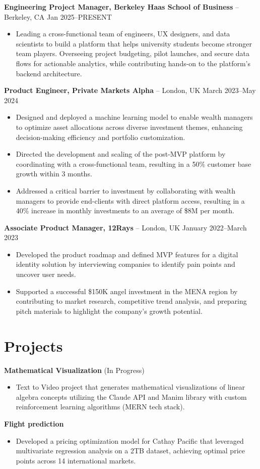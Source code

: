 \documentclass{article}
\begin{document}
\textbf{Engineering Project Manager, Berkeley Haas School of Business} -- Berkeley, CA \hfill Jan 2025--PRESENT
\begin{itemize}[leftmargin=*,noitemsep]
    \item Leading a cross-functional team of engineers, UX designers, and data scientists to build a platform that helps university students become stronger team players. Overseeing project budgeting, pilot launches, and secure data flows for actionable analytics, while contributing hands-on to the platform's backend architecture.
\end{itemize}

\textbf{Product Engineer, Private Markets Alpha} -- London, UK \hfill March 2023--May 2024
\begin{itemize}[leftmargin=*,noitemsep]
    \item Designed and deployed a machine learning model to enable wealth managers to optimize asset allocations across diverse investment themes, enhancing decision-making efficiency and portfolio customization.
    \item Directed the development and scaling of the post-MVP platform by coordinating with a cross-functional team, resulting in a 50\% customer base growth within 3 months.
    \item Addressed a critical barrier to investment by collaborating with wealth managers to provide end-clients with direct platform access, resulting in a 40\% increase in monthly investments to an average of \$8M per month.
\end{itemize}

\textbf{Associate Product Manager, 12Rays} -- London, UK \hfill January 2022--March 2023
\begin{itemize}[leftmargin=*,noitemsep]
    \item Developed the product roadmap and defined MVP features for a digital identity solution by interviewing companies to identify pain points and uncover user needs.
    \item Supported a successful \$150K angel investment in the MENA region by contributing to market research, competitive trend analysis, and preparing pitch materials to highlight the company's growth potential.
\end{itemize}

\section*{Projects}
\textbf{Mathematical Visualization} (In Progress)
\begin{itemize}[leftmargin=*,noitemsep]
    \item Text to Video project that generates mathematical visualizations of linear algebra concepts utilizing the Claude API and Manim library with custom reinforcement learning algorithms (MERN tech stack).
\end{itemize}

\textbf{Flight prediction}
\begin{itemize}[leftmargin=*,noitemsep]
    \item Developed a pricing optimization model for Cathay Pacific that leveraged multivariate regression analysis on a 2TB dataset, achieving optimal price points across 14 international markets.
\end{itemize}
\end{document}
